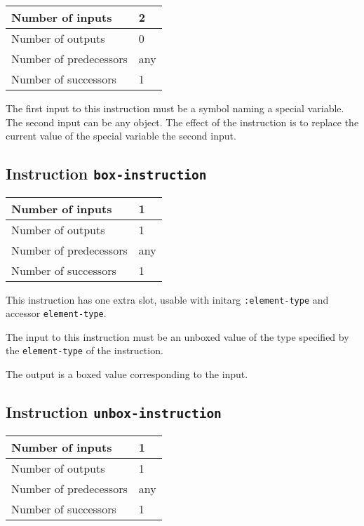 \begin{tabular}{|l|l|}
\hline
Number of inputs & 2\\
\hline
Number of outputs & 0\\
\hline
Number of predecessors & any\\
\hline
Number of successors & 1\\
\hline
\end{tabular}

The first input to this instruction must be a symbol naming a
special variable.  The second input can be any object.  The effect of
the instruction is to replace the current value of the special
variable the second input.

\subsection{Instruction \texttt{box-instruction}}
\label{mir-instruction-box}

\begin{tabular}{|l|l|}
  \hline
  Number of inputs & 1\\
  \hline
  Number of outputs & 1\\
  \hline
  Number of predecessors & any\\
  \hline
  Number of successors & 1\\
  \hline
\end{tabular}

This instruction has one extra slot, usable with initarg
\texttt{:element-type} and accessor \texttt{element-type}.

The input to this instruction must be an unboxed value of the type
specified by the \texttt{element-type} of the instruction.

The output is a boxed value corresponding to the input.

\subsection{Instruction \texttt{unbox-instruction}}
\label{mir-instruction-unbox}

\begin{tabular}{|l|l|}
\hline
Number of inputs & 1\\
\hline
Number of outputs & 1\\
\hline
Number of predecessors & any\\
\hline
Number of successors & 1\\
\hline
\end{tabular}

